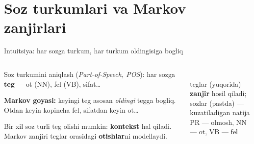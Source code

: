 \documentclass[aspectratio=169,11pt]{beamer}
\newcommand{\uzq}{\textquotesingle{}}
\begin{document}
\section[POS]{So\uzq{}z turkumlari va Markov zanjirlari}

\begin{frame}{Intuitsiya: har so\uzq{}zga turkum, har turkum oldingisiga bog\uzq{}liq}
\footnotesize

\begin{columns}[T,totalwidth=\textwidth]
\begin{column}{0.52\textwidth}
So\uzq{}z turkumini aniqlash (\textit{Part-of-Speech, POS}): har so\uzq{}zga
\textbf{teg} --- ot (NN), fe\uzq{}l (VB), sifat\dots

\vspace{4pt}
\textbf{Markov g\uzq{}oyasi:} keyingi teg asosan \emph{oldingi} tegga bog\uzq{}liq.
Otdan keyin ko\uzq{}pincha fe\uzq{}l, sifatdan keyin ot\dots

\vspace{6pt}
\begin{tcolorbox}[okbox,left=2mm,right=2mm,top=1mm,bottom=1mm]
\scriptsize
Bir xil so\uzq{}z turli teg olishi mumkin: \textbf{kontekst} hal qiladi.
Markov zanjiri teglar orasidagi \textbf{o\uzq{}tishlar}ni modellaydi.
\end{tcolorbox}
\end{column}

\begin{column}{0.46\textwidth}
\centering
{}\\[3pt]
{\scriptsize teglar (yuqorida) \textbf{zanjir} hosil qiladi;\\
so\uzq{}zlar (pastda) --- kuzatiladigan natija\\[2pt]
PR --- olmosh, NN --- ot, VB --- fe\uzq{}l}
\end{column}
\end{columns}

\end{frame}
\end{document}
